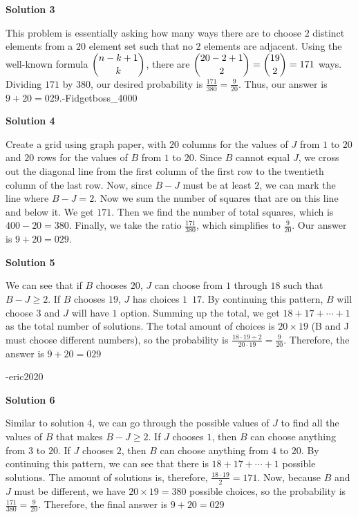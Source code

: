 \begin{enumerate}
\textbf{Solution 3}

This problem is essentially asking how many ways there are to choose $2$ distinct elements from a $20$ element set such that no $2$ elements are adjacent. Using the well-known formula $\dbinom{n-k+1}{k}$, there are $\dbinom{20-2+1}{2} = \dbinom{19}{2} = 171$ ways. Dividing $171$ by $380$, our desired probability is $\frac{171}{380} = \frac{9}{20}$. Thus, our answer is $9+20=\boxed{029}$.-Fidgetboss\_4000

 



\textbf{Solution 4}

Create a grid using graph paper, with $20$ columns for the values of $J$ from $1$ to $20$ and $20$ rows for the values of $B$ from $1$ to $20$. Since $B$ cannot equal $J$, we cross out the diagonal line from the first column of the first row to the twentieth column of the last row. Now, since $B - J$ must be at least $2$, we can mark the line where $B - J = 2$. Now we sum the number of squares that are on this line and below it. We get $171$. Then we find the number of total squares, which is $400 - 20 = 380$. Finally, we take the ratio $\frac{171}{380}$, which simplifies to $\frac{9}{20}$. Our answer is $9+20=\boxed{029}$.

 



\textbf{Solution 5}

We can see that if $B$ chooses $20$, $J$ can choose from $1$ through $18$ such that $B-J\geq 2$. If $B$ chooses $19$, $J$ has choices $1$~$17$. By continuing this pattern, $B$ will choose $3$ and $J$ will have $1$ option. Summing up the total, we get $18+17+\cdots+1$ as the total number of solutions. The total amount of choices is $20\times19$ (B and J must choose different numbers), so the probability is $\frac{18\cdot19\div2}{20\cdot19}=\frac{9}{20}$. Therefore, the answer is $9+20=\boxed{029}$

 -eric2020

 



\textbf{Solution 6}

Similar to solution 4, we can go through the possible values of $J$ to find all the values of $B$ that makes $B-J\geq 2$. If $J$ chooses $1$, then $B$ can choose anything from $3$ to $20$. If $J$ chooses $2$, then $B$ can choose anything from $4$ to $20$. By continuing this pattern, we can see that there is $18+17+\cdots+1$ possible solutions. The amount of solutions is, therefore, $\frac{18\cdot19}{2}=171$. Now, because $B$ and $J$ must be different, we have $20\times19=380$ possible choices, so the probability is $\frac{171}{380}=\frac{9}{20}$. Therefore, the final answer is $9+20=\boxed{029}$


\end{enumerate}
